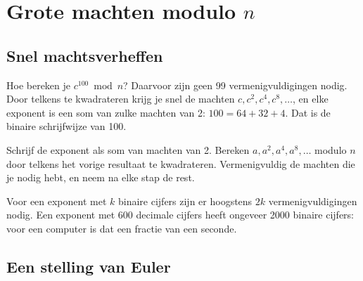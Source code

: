 \section{Grote machten modulo \texorpdfstring{$n$}{n}}

\subsection{Snel machtsverheffen}

Hoe bereken je $c^{100} \bmod n$? Daarvoor zijn geen 99 vermenigvuldigingen nodig. Door telkens te kwadrateren krijg je snel de machten $c, c^2, c^4, c^8, \ldots$, en elke exponent is een som van zulke machten van 2: $100 = 64 + 32 + 4$. Dat is de binaire schrijfwijze van 100.


\begin{werkwijze}
Schrijf de exponent als som van machten van 2. Bereken $a, a^2, a^4, a^8, \ldots$ modulo $n$ door telkens het vorige resultaat te kwadrateren. Vermenigvuldig de machten die je nodig hebt, en neem na elke stap de rest.
\end{werkwijze}

Voor een exponent met $k$ binaire cijfers zijn er hoogstens $2k$ vermenigvuldigingen nodig. Een exponent met 600 decimale cijfers heeft ongeveer 2000 binaire cijfers: voor een computer is dat een fractie van een seconde.

\begin{oefeningen}
\end{oefeningen}

\subsection{Een stelling van Euler}


